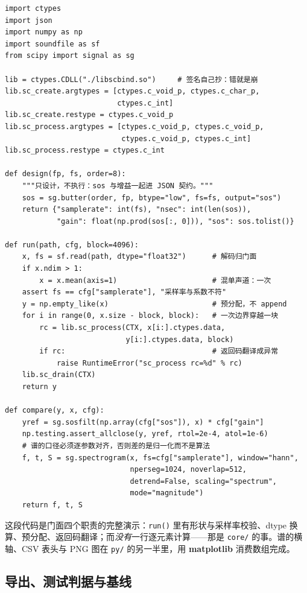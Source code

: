 \documentclass[12pt,a4paper,fontset=fandol]{ctexbook}
\newcommand{\Fn}[1]{\texttt{#1()}}
\newcommand{\Tp}[1]{\texttt{#1}}
\newcommand{\Lib}[1]{\textbf{#1}}
\begin{document}
\begin{lstlisting}[style=pythonstyle,caption={py/spechain.py：设计系数、驱动句柄、与 scipy 对拍},label={lst:ch17-py}]
import ctypes
import json
import numpy as np
import soundfile as sf
from scipy import signal as sg

lib = ctypes.CDLL("./libscbind.so")     # 签名自己抄：错就是崩
lib.sc_create.argtypes = [ctypes.c_void_p, ctypes.c_char_p,
                          ctypes.c_int]
lib.sc_create.restype = ctypes.c_void_p
lib.sc_process.argtypes = [ctypes.c_void_p, ctypes.c_void_p,
                           ctypes.c_void_p, ctypes.c_int]
lib.sc_process.restype = ctypes.c_int

def design(fp, fs, order=8):
    """只设计，不执行：sos 与增益一起进 JSON 契约。"""
    sos = sg.butter(order, fp, btype="low", fs=fs, output="sos")
    return {"samplerate": int(fs), "nsec": int(len(sos)),
            "gain": float(np.prod(sos[:, 0])), "sos": sos.tolist()}

def run(path, cfg, block=4096):
    x, fs = sf.read(path, dtype="float32")      # 解码归门面
    if x.ndim > 1:
        x = x.mean(axis=1)                      # 混单声道：一次
    assert fs == cfg["samplerate"], "采样率与系数不符"
    y = np.empty_like(x)                        # 预分配，不 append
    for i in range(0, x.size - block, block):   # 一次边界穿越一块
        rc = lib.sc_process(CTX, x[i:].ctypes.data,
                            y[i:].ctypes.data, block)
        if rc:                                  # 返回码翻译成异常
            raise RuntimeError("sc_process rc=%d" % rc)
    lib.sc_drain(CTX)
    return y

def compare(y, x, cfg):
    yref = sg.sosfilt(np.array(cfg["sos"]), x) * cfg["gain"]
    np.testing.assert_allclose(y, yref, rtol=2e-4, atol=1e-6)
    # 谱的口径必须逐参数对齐，否则差的是归一化而不是算法
    f, t, S = sg.spectrogram(x, fs=cfg["samplerate"], window="hann",
                             nperseg=1024, noverlap=512,
                             detrend=False, scaling="spectrum",
                             mode="magnitude")
    return f, t, S
\end{lstlisting}

这段代码是门面四个职责的完整演示：\Fn{run} 里有形状与采样率校验、dtype 换算、预分配、返回码翻译；而\emph{没有}一行逐元素计算——那是 \Tp{core/} 的事。谱的横轴、CSV 表头与 PNG 图在 \Tp{py/} 的另一半里，用 \Lib{matplotlib} 消费数组完成。

\subsection{导出、测试判据与基线}
\end{document}
